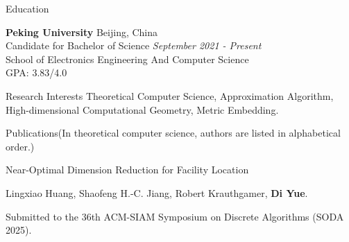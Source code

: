 \documentclass{resume} %
\begin{document}

\begin{rSection}{Education}

{\bf Peking University} \hfill {Beijing, China} 
\\ Candidate for Bachelor of Science \hfill {\em September 2021 - Present}
\\ School of Electronics Engineering And Computer Science
\\ GPA: 3.83/4.0



\end{rSection}

\begin{rSection}{Research Interests}{}
Theoretical Computer Science, Approximation Algorithm, High-dimensional Computational Geometry, Metric Embedding.
\end{rSection}

\begin{rSection}{Publications}{(In theoretical computer science, authors are listed in alphabetical order.)}

    \begin{pubSubsection}{Near-Optimal Dimension Reduction for Facility Location}
        \item Lingxiao Huang, Shaofeng H.-C. Jiang, Robert Krauthgamer, \textbf{Di Yue}.
        \item Submitted to the 36th ACM-SIAM Symposium on Discrete Algorithms (SODA 2025).
    \end{pubSubsection}
\end{rSection}
\end{document}
